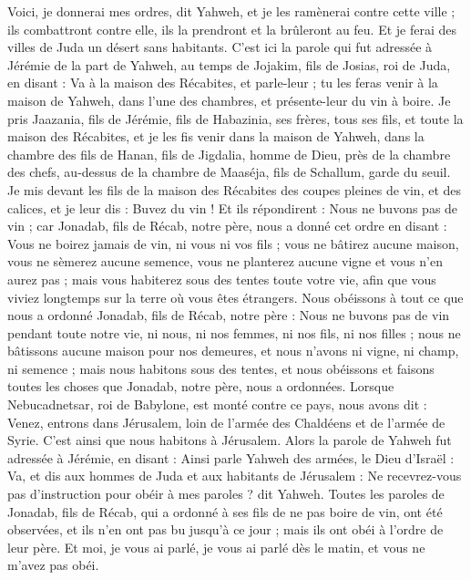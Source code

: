 \begin{multicols}{2}
Voici, je donnerai mes ordres, dit Yahweh, et je les ramènerai contre cette ville ; ils combattront contre elle, ils la prendront et la brûleront au feu. Et je ferai des villes de Juda un désert sans habitants.
\VerseOne{}C'est ici la parole qui fut adressée à Jérémie de la part de Yahweh, au temps de Jojakim, fils de Josias, roi de Juda, en disant :
Va à la maison des Récabites, et parle-leur ; tu les feras venir à la maison de Yahweh, dans l’une des chambres, et présente-leur du vin à boire.
Je pris Jaazania, fils de Jérémie, fils de Habazinia, ses frères, tous ses fils, et toute la maison des Récabites,
et je les fis venir dans la maison de Yahweh, dans la chambre des fils de Hanan, fils de Jigdalia, homme de Dieu, près de la chambre des chefs, au-dessus de la chambre de Maaséja, fils de Schallum, garde du seuil.
Je mis devant les fils de la maison des Récabites des coupes pleines de vin, et des calices, et je leur dis : Buvez du vin !
Et ils répondirent : Nous ne buvons pas de vin ; car Jonadab, fils de Récab, notre père, nous a donné cet ordre en disant : Vous ne boirez jamais de vin, ni vous ni vos fils ;
vous ne bâtirez aucune maison, vous ne sèmerez aucune semence, vous ne planterez aucune vigne et vous n'en aurez pas ; mais vous habiterez sous des tentes toute votre vie, afin que vous viviez longtemps sur la terre où vous êtes étrangers.
Nous obéissons à tout ce que nous a ordonné Jonadab, fils de Récab, notre père : Nous ne buvons pas de vin pendant toute notre vie, ni nous, ni nos femmes, ni nos fils, ni nos filles ;
nous ne bâtissons aucune maison pour nos demeures, et nous n'avons ni vigne, ni champ, ni semence ;
mais nous habitons sous des tentes, et nous obéissons et faisons toutes les choses que Jonadab, notre père, nous a ordonnées.
Lorsque Nebucadnetsar, roi de Babylone, est monté contre ce pays, nous avons dit : Venez, entrons dans Jérusalem, loin de l'armée des Chaldéens et de l'armée de Syrie. C’est ainsi que nous habitons à Jérusalem.
Alors la parole de Yahweh fut adressée à Jérémie, en disant :
Ainsi parle Yahweh des armées, le Dieu d'Israël : Va, et dis aux hommes de Juda et aux habitants de Jérusalem : Ne recevrez-vous pas d'instruction pour obéir à mes paroles ? dit Yahweh.
Toutes les paroles de Jonadab, fils de Récab, qui a ordonné à ses fils de ne pas boire de vin, ont été observées, et ils n'en ont pas bu jusqu’à ce jour ; mais ils ont obéi à l’ordre de leur père. Et moi, je vous ai parlé, je vous ai parlé dès le matin, et vous ne m'avez pas obéi.

\end{multicols}
